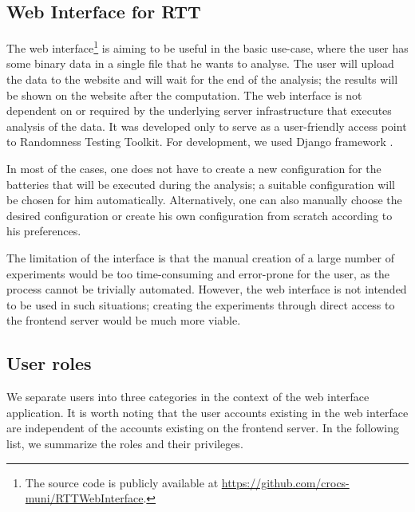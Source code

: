 \documentclass[
	digital,    %
	oneside,
	color,
	11pt,
	nocover,
	notable,
	nolof,
	nolot,
]{fithesis3}
\theoremstyle{definition}
\theoremstyle{remark}
\begin{document}
\subsection{Web Interface for RTT}
The web interface\footnote{The source code is publicly available at \url{https://github.com/crocs-muni/RTTWebInterface}.} is aiming to be useful in the basic use-case, where the user has some binary data in a single file that he wants to analyse. The user will upload the data to the website and will wait for the end of the analysis; the results will be shown on the website after the computation. The web interface is not dependent on or required by the underlying server infrastructure that executes analysis of the data. It was developed only to serve as a user-friendly access point to Randomness Testing Toolkit. For development, we used Django framework \cite{django}.

In most of the cases, one does not have to create a new configuration for the batteries that will be executed during the analysis; a suitable configuration will be chosen for him automatically. Alternatively, one can also manually choose the desired configuration or create his own configuration from scratch according to his preferences.

The limitation of the interface is that the manual creation of a large number of experiments would be too time-consuming and error-prone for the user, as the process cannot be trivially automated. However, the web interface is not intended to be used in such situations; creating the experiments through direct access to the frontend server would be much more viable. 

\subsection*{User roles}
We separate users into three categories in the context of the web interface application. It is worth noting that the user accounts existing in the web interface are independent of the accounts existing on the frontend server. In the following list, we summarize the roles and their privileges.
\end{document}
